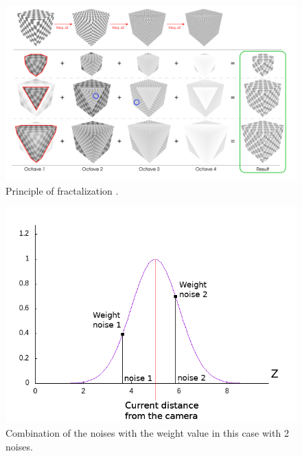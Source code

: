 \begin{figure}
    \begin{center}
    \includegraphics[scale=0.3]{images/fractalization_principle.png}
    \end{center}
    \caption{Principle of fractalization \cite{benard_dynamic_2010}.}
    \label{fractalization_principle}
\end{figure}

\begin{figure}
    \begin{center}
    \includegraphics[scale=0.6]{images/fractal_explained.png}
    \end{center}
    \caption{Combination of the noises with the weight value in this case with 2 noises.}
    \label{fractalization_practical}
\end{figure}


